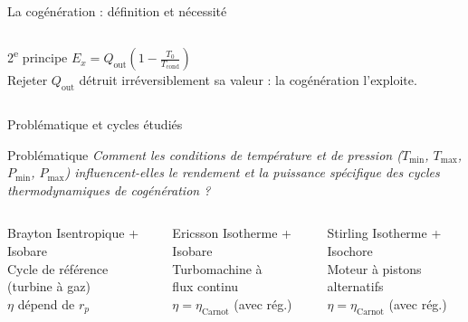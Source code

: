 \documentclass[aspectratio=43, 10pt]{beamer}
\newcommand{\Tmin}{T_{\min}}
\newcommand{\Tmax}{T_{\max}}
\newcommand{\Pmin}{P_{\min}}
\newcommand{\Pmax}{P_{\max}}
\newcommand{\rp}{r_p}
\newcommand{\etaC}{\eta_{\text{Carnot}}}
\newcommand{\Qout}{Q_{\text{out}}}
\begin{document}
\begin{frame}{La cog\'en\'eration : d\'efinition et n\'ecessit\'e}
\begin{columns}[T,onlytextwidth]
      \vspace{0.35em}
      \begin{exampleblock}{2\textsuperscript{e} principe}
        \small
        $E_x = \Qout\!\left(1-\frac{T_0}{T_\text{cond}}\right)$\\[2pt]
        Rejeter $\Qout$ d\'etruit irr\'eversiblement
        sa valeur : la cog\'en\'eration l'exploite.
      \end{exampleblock}
  \end{columns}

\end{frame}

\begin{frame}{Probl\'ematique et cycles \'etudi\'es}

  \begin{alertblock}{Probl\'ematique}
    \centering
    \textit{Comment les conditions de temp\'erature et de pression
    ($\Tmin$, $\Tmax$, $\Pmin$, $\Pmax$)
    influencent-elles le rendement et la puissance sp\'ecifique
    des cycles thermodynamiques de cog\'en\'eration ?}
  \end{alertblock}

  \vspace{0.9em}
  \begin{columns}[T,onlytextwidth]
      \begin{block}{\textcolor{rougeCycle}{Brayton}}
        \small
        Isentropique + Isobare\\[4pt]
        Cycle de r\'ef\'erence\\
        (turbine \`a gaz)\\[4pt]
        $\eta$ d\'epend de $\rp$
      \end{block}

      \begin{block}{\textcolor{bleuMarine}{Ericsson}}
        \small
        Isotherme + Isobare\\[4pt]
        Turbomachine \`a\\
        flux continu\\[4pt]
        $\eta = \etaC$ (avec r\'eg.)
      \end{block}

      \begin{block}{\textcolor{vertCycle}{Stirling}}
        \small
        Isotherme + Isochore\\[4pt]
        Moteur \`a pistons\\
        alternatifs\\[4pt]
        $\eta = \etaC$ (avec r\'eg.)
      \end{block}
  \end{columns}


\end{frame}
\end{document}
